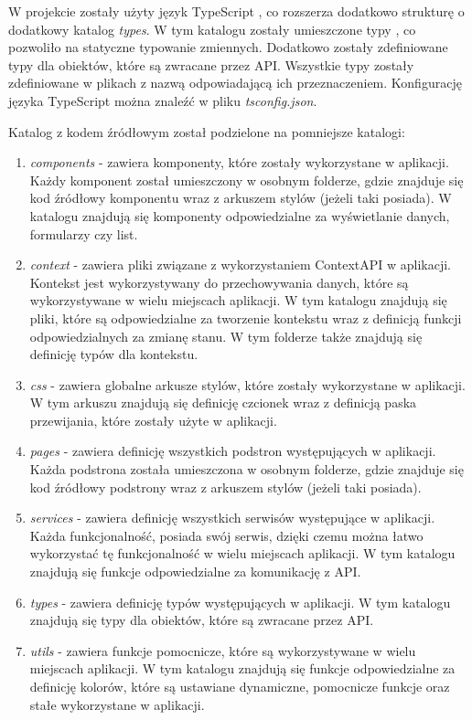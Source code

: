 W projekcie zostały użyty język TypeScript \cite{TypeScript}, co rozszerza dodatkowo strukturę o dodatkowy katalog \textit{types}. W tym katalogu zostały umieszczone typy \cite{TypeScript_types}, co pozwoliło na statyczne typowanie zmiennych. Dodatkowo zostały zdefiniowane typy dla obiektów, które są zwracane przez API. Wszystkie typy zostały zdefiniowane w plikach z nazwą odpowiadającą ich przeznaczeniem. Konfigurację języka TypeScript można znaleźć w pliku \textit{tsconfig.json}.

Katalog z kodem źródłowym został podzielone na pomniejsze katalogi:
\begin{enumerate}
    \item \textit{components} - zawiera komponenty, które zostały wykorzystane w aplikacji. Każdy komponent został umieszczony w osobnym folderze, gdzie znajduje się kod źródłowy komponentu wraz z arkuszem stylów (jeżeli taki posiada). W katalogu znajdują się komponenty odpowiedzialne za wyświetlanie danych, formularzy czy list.
    \item \textit{context} - zawiera pliki związane z wykorzystaniem ContextAPI \cite{React_context} w aplikacji. Kontekst jest wykorzystywany do przechowywania danych, które są wykorzystywane w wielu miejscach aplikacji. W tym katalogu znajdują się pliki, które są odpowiedzialne za tworzenie kontekstu wraz z definicją funkcji odpowiedzialnych za zmianę stanu. W tym folderze także znajdują się definicję typów dla kontekstu.
    \item \textit{css} - zawiera globalne arkusze stylów, które zostały wykorzystane w aplikacji. W tym arkuszu znajdują się definicję czcionek wraz z definicją paska przewijania, które zostały użyte w aplikacji.
    \item \textit{pages} - zawiera definicję wszystkich podstron występujących w aplikacji. Każda podstrona została umieszczona w osobnym folderze, gdzie znajduje się kod źródłowy podstrony wraz z arkuszem stylów (jeżeli taki posiada).
    \item \textit{services} - zawiera definicję wszystkich serwisów występujące w aplikacji. Każda funkcjonalność, posiada swój serwis, dzięki czemu można łatwo wykorzystać tę funkcjonalność w wielu miejscach aplikacji. W tym katalogu znajdują się funkcje odpowiedzialne za komunikację z API.
    \item \textit{types} - zawiera definicję typów występujących w aplikacji. W tym katalogu znajdują się typy dla obiektów, które są zwracane przez API.
    \item \textit{utils} - zawiera funkcje pomocnicze, które są wykorzystywane w wielu miejscach aplikacji. W tym katalogu znajdują się funkcje odpowiedzialne za definicję kolorów, które są ustawiane dynamiczne, pomocnicze funkcje oraz stałe wykorzystane w aplikacji.
\end{enumerate}


